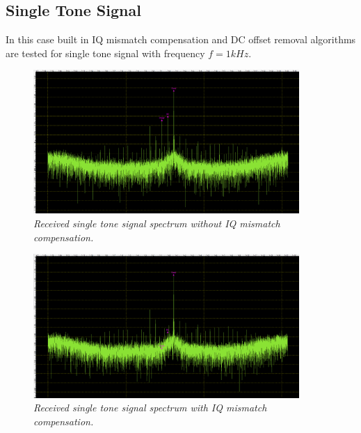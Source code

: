 \documentclass[en,printmode]{mgr}
\begin{document}
		\subsection*{Single Tone Signal}
		In this case built in IQ mismatch compensation and DC offset removal algorithms are
	 	tested for
		single tone signal with frequency $f=1kHz$.
		\begin{figure}[H]
    			\centering
   				\includegraphics[width=0.9\textwidth]{plots/real_single_off.png}
   		 		\caption{\textit{Received single tone signal spectrum without IQ mismatch compensation.}}
   		 	\end{figure}
   		 	\begin{figure}[H]
    			\centering
   				\includegraphics[width=0.9\textwidth]{plots/real_single_on.png}
   		 		\caption{\textit{Received single tone signal spectrum with IQ mismatch compensation.}}
   		 	\end{figure}
   		 	
\end{document}

